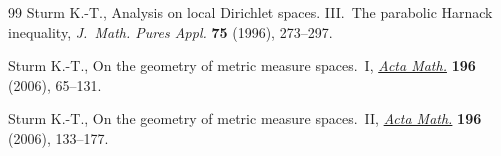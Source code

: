 \begin{thebibliography}{99}
Sturm K.-T., Analysis on local {D}irichlet spaces. {III}.~{T}he parabolic
 {H}arnack inequality, \textit{J.~Math. Pures Appl.} \textbf{75} (1996),
 273--297.

Sturm K.-T., On the geometry of metric measure spaces.~{I}, \href{https://doi.org/10.1007/s11511-006-0002-8}{\textit{Acta Math.}}
 \textbf{196} (2006), 65--131.

Sturm K.-T., On the geometry of metric measure spaces.~{II}, \href{https://doi.org/10.1007/s11511-006-0003-7}{\textit{Acta Math.}}
 \textbf{196} (2006), 133--177.

\end{thebibliography}

